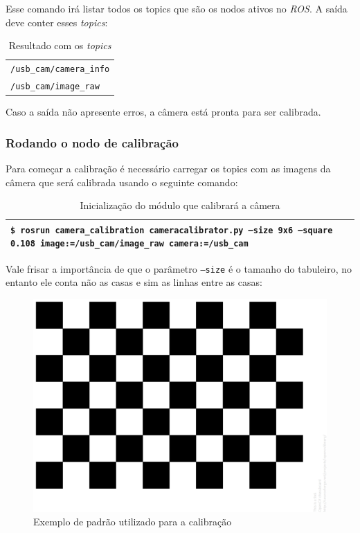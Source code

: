Esse comando irá listar todos os topics que são os nodos ativos no \textit{ROS}. A saída deve conter esses \textit{topics}:

\begin{table}[!ht]\label{tb:3}
\begin{tabular}{| p{\textwidth}|}
\hline
\texttt{/usb\_cam/camera\_info} \\
\texttt{/usb\_cam/image\_raw}\\
\hline
\end{tabular}
\caption{Resultado com os \textit{topics}}
\end{table}

Caso a saída não apresente erros, a câmera está pronta para ser calibrada.

\subsubsection{Rodando o nodo de calibração}

Para começar a calibração é necessário carregar os topics com as imagens da câmera que será calibrada usando o seguinte comando:

\begin{table}[!ht]\label{tb:4}
\begin{tabular}{| p{\textwidth}|}
\hline
\texttt{\$ rosrun camera\_calibration cameracalibrator.py --size 9x6 --square 0.108 image:=/usb\_cam/image\_raw camera:=/usb\_cam}\\
\hline
\end{tabular}
\caption{Inicialização do módulo que calibrará a câmera}
\end{table}

Vale frisar a importância de que o parâmetro \texttt{--size} é o tamanho do tabuleiro, no entanto ele conta não as casas e sim as linhas entre as casas:

\begin{figure}[!htb]
	\centering
		\includegraphics[width= \textwidth]{Imagens/figura3-3E3-12.png}
	\caption{Exemplo de padrão utilizado para a calibração}
	\label{fig3:12}
\end{figure}


